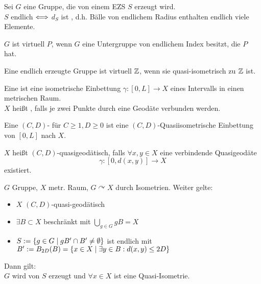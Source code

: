 \documentclass{article}
\begin{document}
\Satz{}
Sei $G$ eine Gruppe, die von einem EZS $S$ erzeugt wird.\\
$S$ endlich $\overset{}{\Longleftrightarrow}$ $d_S$ ist , d.h. Bälle von endlichem Radius enthalten endlich viele Elemente. 


\Bsp{}

$G$ ist virtuell $P$, wenn $G$ eine Untergruppe von endlichem Index besitzt, die $P$ hat.


\Satz{}
Eine endlich erzeugte Gruppe ist virtuell $\mathbb{Z}$, wenn sie quasi-isometrisch zu $\mathbb{Z}$ ist.





Eine  ist eine isometrische Einbettung $\gamma : [0,L] \rightarrow X$ eines Intervalls in einen metrischen Raum.\\
$X$ heißt , falls je zwei Punkte durch eine Geodäte verbunden werden.


Eine $(C,D)$- für $C\geq 1, D \geq 0$ ist eine $(C,D)$-Quasiisometrische Einbettung von $[0,L]$ nach $X$.

$X$ heißt $(C,D)$-quasigeodätisch, falls $\forall x,y \in X$ eine verbindende Quasigeodäte \[\gamma :[0,d(x,y)] \rightarrow X \] existiert.


$G$ Gruppe, $X$ metr. Raum, $G\curvearrowright X$ durch Isometrien. Weiter gelte:
\begin{itemize}
\item $X$ $(C,D)$-quasi-geodätisch
\item $\exists B \subset X$ beschränkt mit $\bigcup_{g\in G}gB = X$
\item $S:=\set{g\in G}{gB' \cap B' \neq \emptyset}$ ist endlich mit $B' := B_{2D}(B) = \set{x\in X}{\exists y \in B: d(x,y) \leq 2D}$
\end{itemize}
Dann gilt:\\
$G$ wird von $S$ erzeugt und
$\forall x \in X$ ist 
eine Quasi-Isometrie.
\end{document}
